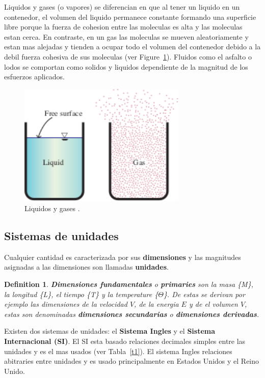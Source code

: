 \documentclass[10pt, oneside]{article}
\newtheorem{defn}{Definition}
\begin{document}
Liquidos y gases (o vapores) se diferencian en que al tener un liquido en un contenedor, el volumen del liquido permanece constante formando una superficie libre porque la fuerza de cohesion entre las moleculas es alta y las moleculas estan cerca. En contraste, en un gas las moleculas se mueven aleatoriamente y estan mas alejadas y tienden a ocupar todo el volumen del contenedor debido a la debil fuerza cohesiva de sus moleculas (ver Figure~\ref{f2}). Fluidos como el asfalto o lodos se comportan como solidos y liquidos dependiente de la magnitud de los esfuerzos aplicados. 

\begin{figure}[h]
\centering
\includegraphics[width=8cm]{liqGas}
\caption{Liquidos y gases \cite{this}.}
\label{f2}
\end{figure}



\subsection{Sistemas de unidades}
Cualquier cantidad es caracterizada por sus \textbf{dimensiones} y las magnitudes asignadas a las dimensiones son llamadas \textbf{unidades}.

\begin{defn}
\textbf{Dimensiones fundamentales} o \textbf{primaries} son la masa \{M\}, la longitud \{L\}, el tiempo \{T\} y la temperature \{$\Theta$\}. De estas se derivan por ejemplo las dimensiones de la velocidad $V$, de la energia $E$ y de el volumen $V$, estas son denominadas \textbf{dimensiones secundarias} o \textbf{dimensiones derivadas}.
\end{defn}

Existen dos sistemas de unidades: el \textbf{Sistema Ingles} y el \textbf{Sistema Internacional (SI)}. El SI esta basado relaciones decimales simples entre las unidades y es el mas usados (ver Tabla~\ref{t1}). El sistema Ingles relaciones abitraries entre unidades y es usado principalmente en Estados Unidos y el Reino Unido. 
\end{document}
